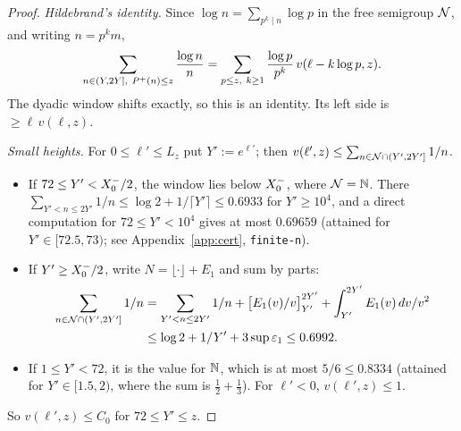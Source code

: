 \begin{proof}
\emph{Hildebrand's identity.} Since $\log n=\sum_{p^k\mid n}\log p$ in the free semigroup $\mathcal{N}$, and writing
$n=p^km$,
\[
  \sum_{n\in(Y,2Y],\ P^{+}(n)\le z}\frac{\log n}{n}=\sum_{p\le z,\ k\ge1}\frac{\log p}{p^k}\,v(\ell-k\log p,z).
\]
The dyadic window shifts exactly, so this is an identity. Its left side is $\ge\ell\,v(\ell,z)$.

\emph{Small heights.} For $0\le\ell'\le L_z$ put $Y':=e^{\ell'}$; then $v(\ell',z)\le\sum_{n\in\mathcal{N}\cap(Y',2Y']}1/n$.
\begin{itemize}
\item If $72\le Y'<X_0^{-}/2$, the window lies below $X_0^{-}$, where $\mathcal{N}=\mathbb{N}$. There
  $\sum_{Y'<n\le2Y'}1/n\le\log2+1/\lceil Y'\rceil\le0.6933$ for $Y'\ge10^4$, and a direct computation for $72\le Y'<10^4$
  gives at most $0.69659$ (attained for $Y'\in[72.5,73)$; see Appendix~\ref{app:cert}, \texttt{finite-n}).
\item If $Y'\ge X_0^{-}/2$, write $N=\lfloor\cdot\rfloor+E_1$ and sum by parts:
  \begin{multline*}
    \sum_{n\in\mathcal{N}\cap(Y',2Y']}1/n=\sum_{Y'<n\le2Y'}1/n+\big[E_1(v)/v\big]_{Y'}^{2Y'}+\int_{Y'}^{2Y'}E_1(v)\,dv/v^2\\
    \le\log2+1/Y'+3\sup\varepsilon_1\le0.6992.
  \end{multline*}
\item If $1\le Y'<72$, it is the value for $\mathbb{N}$, which is at most $5/6\le0.8334$ (attained for $Y'\in[1.5,2)$, where the sum is $\frac12+\frac13$). For $\ell'<0$,
  $v(\ell',z)\le1$.
\end{itemize}
So $v(\ell',z)\le C_0$ for $72\le Y'\le z$.


\end{proof}
